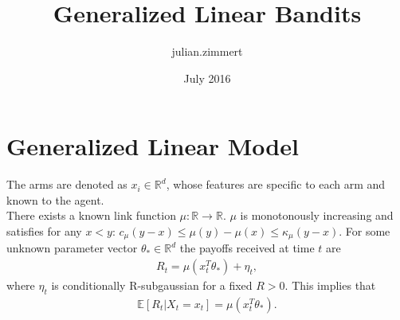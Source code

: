 \documentclass{article}
\title{Generalized Linear Bandits}
\author{julian.zimmert }
\date{July 2016}
\theoremstyle{definition}
\begin{document}
\maketitle
\section{Generalized Linear Model}
The arms are denoted as $x_i \in \mathbb{R}^d$, whose features are specific to each arm and known to the agent.\\
There exists a known link function $\mu:\mathbb{R}\rightarrow\mathbb{R}$. $\mu$ is monotonously increasing and satisfies for any $x<y$: $c_\mu (y-x)\leq\mu(y)-\mu(x)\leq \kappa_\mu(y-x)$. For some unknown parameter vector $\theta_*\in\mathbb{R}^d$ the payoffs received at time $t$ are
\begin{align}
R_t = \mu(x_t^T\theta_*) + \eta_t,
\end{align}
where $\eta_t$ is conditionally R-subgaussian for a fixed $R>0$. This implies that
\begin{align}
    \mathbb{E}[R_t|X_t=x_t] = \mu(x_t^T\theta_*).
\end{align}

 

 


\end{document}
